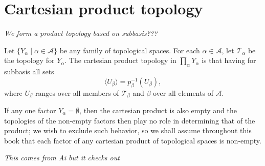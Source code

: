 \documentclass[12pt]{article} %
\begin{document}
\section{Cartesian product topology}
\textit{We form a product topology based on subbasis???}

\begin{definition}
\end{definition}

\begin{definition}\parencite{Dugundji1966}
	Let $\{Y_\alpha \mid \alpha \in \mathcal{A}\}$ be any family of topological spaces. For each $\alpha \in \mathcal{A}$, let $\mathcal{T}_\alpha$ be the topology for $Y_\alpha$. The cartesian product topology in $\prod_\alpha Y_\alpha$ is that having for subbasis all sets
	\[ \langle U_\beta \rangle = p_\beta^{-1}(U_\beta), \]
	where $U_\beta$ ranges over all members of $\mathcal{T}_\beta$ and $\beta$ over all elements of $\mathcal{A}$.
	
	If any one factor $Y_\alpha = \emptyset$, then the cartesian product is also empty and the topologies of the non-empty factors then play no role in determining that of the product; we wish to exclude such behavior, so we shall assume throughout this book that each factor of any cartesian product of topological spaces is non-empty.
\end{definition}

\textit{This comes from Ai but it checks out}
\end{document}
